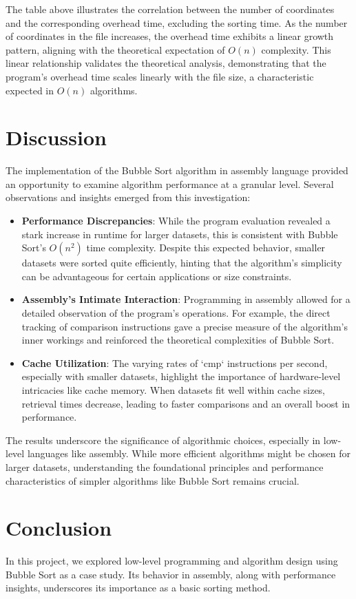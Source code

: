 \documentclass[12pt,a4paper]{article}
\begin{document}
The table above illustrates the correlation between the number of coordinates and the corresponding overhead time, excluding the sorting time. As the number of coordinates in the file increases, the overhead time exhibits a linear growth pattern, aligning with the theoretical expectation of \( O(n) \) complexity. This linear relationship validates the theoretical analysis, demonstrating that the program's overhead time scales linearly with the file size, a characteristic expected in \( O(n) \) algorithms.



\section{Discussion}
The implementation of the Bubble Sort algorithm in assembly language provided an opportunity to examine algorithm performance at a granular level. Several observations and insights emerged from this investigation:

\begin{itemize}
    \item \textbf{Performance Discrepancies}: While the program evaluation revealed a stark increase in runtime for larger datasets, this is consistent with Bubble Sort's \(O(n^2)\) time complexity. Despite this expected behavior, smaller datasets were sorted quite efficiently, hinting that the algorithm's simplicity can be advantageous for certain applications or size constraints.
    
    \item \textbf{Assembly's Intimate Interaction}: Programming in assembly allowed for a detailed observation of the program's operations. For example, the direct tracking of comparison instructions gave a precise measure of the algorithm's inner workings and reinforced the theoretical complexities of Bubble Sort.
    
    \item \textbf{Cache Utilization}: The varying rates of `cmp` instructions per second, especially with smaller datasets, highlight the importance of hardware-level intricacies like cache memory. When datasets fit well within cache sizes, retrieval times decrease, leading to faster comparisons and an overall boost in performance.
\end{itemize}

The results underscore the significance of algorithmic choices, especially in low-level languages like assembly. While more efficient algorithms might be chosen for larger datasets, understanding the foundational principles and performance characteristics of simpler algorithms like Bubble Sort remains crucial.

\section{Conclusion}
In this project, we explored low-level programming and algorithm design using Bubble Sort as a case study. Its behavior in assembly, along with performance insights, underscores its importance as a basic sorting method.
% 
% 
\end{document}
